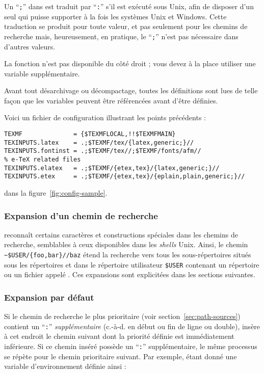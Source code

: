 \documentclass[german, english, french]{article}
\renewcommand{\samp}[1]{\enquote{\texttt{#1}}}
\begin{document}
\begin{itemize*}
  Un \samp{;} dans  est traduit par \samp{:} s'il est exécuté sous
  Unix, afin de disposer d'un seul  qui puisse supporter à la
  fois les systèmes Unix et Windows. Cette traduction se produit pour toute
  valeur, et pas seulement pour les chemins de recherche mais, heureusement, en
  pratique, le \samp{;} n'est pas nécessaire dans d'autres valeurs.

  La fonction  n'est pas disponible du côté droit ;
  vous devez à la place utiliser une variable supplémentaire.
\item Avant tout désarchivage ou décompactage, toutes les définitions sont lues
  de telle façon que les variables peuvent être référencées avant d'être
  définies.
\end{itemize*}
Voici un fichier de configuration illustrant les points précédents :
\ifSingleColumn

\begin{verbatim}
TEXMF              = {$TEXMFLOCAL,!!$TEXMFMAIN}
TEXINPUTS.latex    = .;$TEXMF/tex/{latex,generic;}//
TEXINPUTS.fontinst = .;$TEXMF/tex//;$TEXMF/fonts/afm//
% e-TeX related files
TEXINPUTS.elatex   = .;$TEXMF/{etex,tex}/{latex,generic;}//
TEXINPUTS.etex     = .;$TEXMF/{etex,tex}/{eplain,plain,generic;}//
\end{verbatim}

\else dans la figure~\ref{fig:config-sample}.  \fi

\subsubsection{Expansion d'un chemin de recherche}
\label{sec:path-expansion}

\KPS{} reconnaît certains caractères et constructions spéciales dans les chemins
de recherche, semblables à ceux disponibles dans les \textit{shells}
Unix. Ainsi, le chemin \verb+~$USER/{foo,bar}//baz+ %
étend la recherche vers tous les sous-répertoires situés sous les répertoires
 et  dans le répertoire utilisateur \texttt{\$USER}
contenant un répertoire ou un fichier appelé %
. Ces expansions sont explicitées dans les sections suivantes.

\subsubsection{Expansion par défaut}
\label{sec:default-expansion}

Si le chemin de recherche le plus prioritaire (voir
section~\ref{sec:path-sources}) contient un \samp{:} \emph{supplémentaire}
(\mbox{c.-à-d.} en début ou fin de ligne ou double), \KPS{} insère à cet endroit
le chemin suivant dont la priorité définie est immédiatement inférieure. Si ce
chemin inséré possède un \samp{:} supplémentaire, le même processus se répète
pour le chemin prioritaire suivant.  Par exemple, étant donné une variable
d'environnement définie ainsi :
\end{document}
